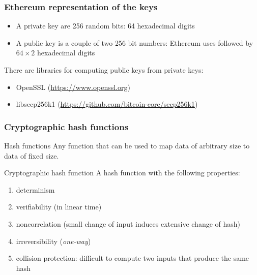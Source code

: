 \documentclass[11pt]{beamer}  %
\def\codesize{\smaller}
\def\<#1>{\codeid{#1}}
\newcommand{\codeid}[1]{\ifmmode{\mbox{\codesize\ttfamily{#1}}}\else{\codesize\ttfamily #1}\fi}
\begin{document}
\begin{frame}\frametitle{Ethereum representation of the keys}

  \begin{itemize}
    \item A private key are 256 random bits: 64 hexadecimal digits
    \item A public key is a couple of two 256 bit numbers: Ethereum
      uses \<0x04> followed by $64\times 2$ hexadecimal digits
  \end{itemize}

  \bigskip

  There are libraries for computing public keys from private keys:

  \begin{itemize}
  \item OpenSSL (\url{https://www.openssl.org})
  \item libsecp256k1 (\url{https://github.com/bitcoin-core/secp256k1})
  \end{itemize}

\end{frame}

\begin{frame}\frametitle{Cryptographic hash functions}

  \begin{greenbox}{Hash functions}
    Any function that can be used to map data of arbitrary size to data of
    fixed size.
  \end{greenbox}

  \bigskip

  \begin{greenbox}{Cryptographic hash function}
    A hash function with the following properties:
    \begin{enumerate}
    \item determinism
    \item verifiability (in linear time)
    \item noncorrelation (small change of input induces extensive change of hash)
    \item irreversibility (\emph{one-way})
    \item collision protection: difficult to compute two inputs that produce the same hash
    \end{enumerate}
  \end{greenbox}
  
\end{frame}
\end{document}
